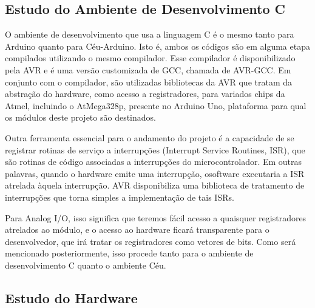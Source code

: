 \documentclass{article}
\begin{document}
\subsection{Estudo do Ambiente de Desenvolvimento C}

\tab O ambiente de desenvolvimento que usa a linguagem C é o mesmo tanto para Arduino quanto para
Céu-Arduino. Isto é, ambos os códigos são em alguma etapa compilados utilizando o mesmo
compilador. Esse compilador é disponibilizado pela AVR e é uma versão customizada de GCC,
chamada de AVR-GCC. Em conjunto com o compilador, são utilizadas bibliotecas da AVR que
tratam da abstração do hardware, como acesso a registradores, para variados chips da Atmel, incluindo
o AtMega328p, presente no Arduino Uno, plataforma para qual os módulos deste projeto são
destinados.
\par Outra ferramenta essencial para o andamento do projeto é a capacidade de se registrar rotinas de
serviço a interrupções (Interrupt Service Routines, ISR), que são rotinas de código associadas a
interrupções do microcontrolador. Em outras palavras, quando o hardware emite uma interrupção, osoftware executaria a ISR atrelada àquela interrupção. AVR disponibiliza uma biblioteca de tratamento
de interrupções que torna simples a implementação de tais ISRs.
\par Para Analog I/O, isso significa que teremos fácil acesso a quaisquer registradores atrelados ao
módulo, e o acesso ao hardware ficará transparente para o desenvolvedor, que irá tratar os
registradores como vetores de bits. Como será mencionado posteriormente, isso procede tanto para
o ambiente de desenvolvimento C quanto o ambiente Céu.

\subsection{Estudo do Hardware}
\end{document}
